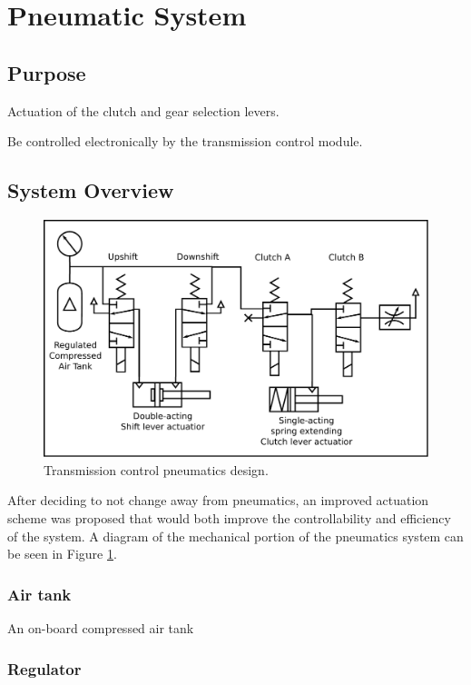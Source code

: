 \section{Pneumatic System}

\subsection{Purpose}

Actuation of the clutch and gear selection levers. 

Be controlled electronically by the transmission control module.


\subsection{System Overview}

\begin{figure}
\centering
\includegraphics[scale=0.5]{design/figures/pneumatics}
\caption{Transmission control pneumatics design.}
\label{fig:pneumatics_design}
\end{figure}

After deciding to not change away from pneumatics, an improved actuation scheme was proposed that would both improve the controllability and efficiency of the system. A diagram of the mechanical portion of the pneumatics system can be seen in Figure \ref{fig:pneumatics_design}.

\subsubsection{Air tank}

An on-board compressed air tank 

\subsubsection{Regulator}

